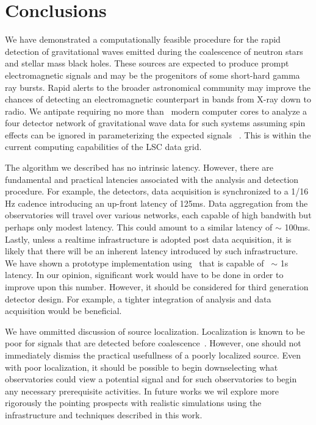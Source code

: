 \section{Conclusions}
\label{SECV}\label{sec:conclusions}

We have demonstrated a computationally feasible procedure for the rapid
detection of gravitational waves emitted during the coalescence of neutron
stars and stellar mass black holes.  These sources are expected to produce
prompt electromagnetic signals and may be the progenitors of some short-hard
gamma ray bursts.  Rapid alerts to the broader astronomical community may
improve the chances of detecting an electromagnetic counterpart in bands from
X-ray down to radio.  We antipate requiring no more than \numcpus\ modern
computer cores to analyze a four detector network of gravitational wave data
for such systems assuming spin effects can be ignored in parameterizing the
expected signals ~\cite{the papers that say that is okay}.  This is within the
current computing capabilities of the LSC data grid\cite{LDG}.

The algorithm we described has no intrinsic latency.  However, there are
fundamental and practical latencies associated with the analysis and detection
procedure. For example, the \LIGO detectors, data acquisition is synchronized
to a 1/16 Hz cadence introducing an up-front latency of 125ms.  Data
aggregation from the observatories will travel over various networks, each
capable of high bandwith but perhaps only modest latency.  This could amount to
a similar latency of $\sim$ 100ms.  Lastly, unless a realtime infrastructure is
adopted post data acquisition, it is likely that there will be an inherent
latency introduced by such infrastructure.  We have shown a prototype
implementation using \gstlal\ that is capable of ~$\sim$ 1s latency. In our
opinion, significant work would have to be done in order to improve upon this
number. However, it should be considered for third generation detector design.
For example, a tighter integration of analysis and data acquisition would be
beneficial.

We have ommitted discussion of source localization.  Localization is known to
be poor for signals that are detected before coalescence~\cite{fairhurst}.
However, one should not immediately dismiss the practical usefullness of a
poorly localized source.  Even with poor localization, it should be possible to
begin downselecting what observatories could view a potential signal and for
such observatories to begin any necessary prerequisite activities.  In future
works we wil explore more rigorously the pointing prospects with realistic
simulations using the infrastructure and techniques described in this work.

